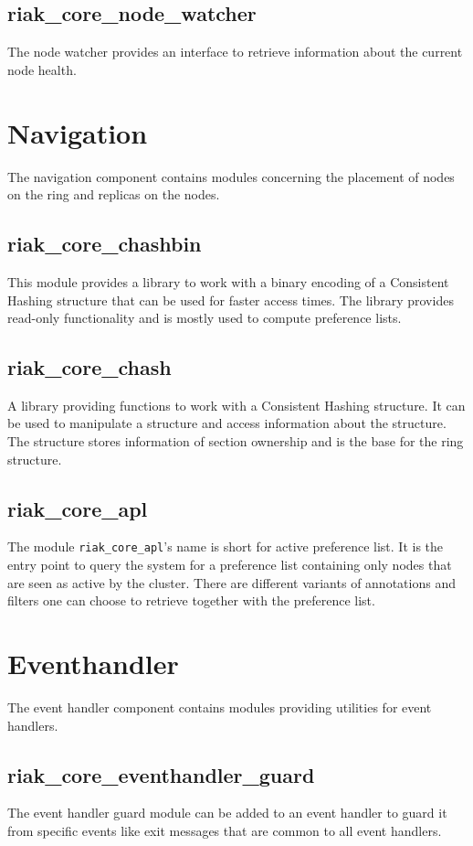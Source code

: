 	\subsection{riak\_core\_node\_watcher}
		The node watcher provides an interface to retrieve information about the current node health.
	

\section{Navigation}
	The navigation component contains modules concerning the placement of nodes on the ring and replicas on the nodes.
	\subsection{riak\_core\_chashbin}
		This module provides a library to work with a binary encoding of a Consistent Hashing structure that can be used for faster access times.
		The library provides read-only functionality and is mostly used to compute preference lists.
	
	\subsection{riak\_core\_chash}
		A library providing functions to work with a Consistent Hashing structure.
		It can be used to manipulate a structure and access information about the structure.
		The structure stores information of section ownership and is the base for the ring structure.
	
	\subsection{riak\_core\_apl}
		The module \lstinline!riak_core_apl!'s name is short for active preference list.
		It is the entry point to query the system for a preference list containing only nodes that are seen as active by the cluster.
		There are different variants of annotations and filters one can choose to retrieve together with the preference list. 
	

\section{Eventhandler}
	The event handler component contains modules providing utilities for event handlers.
	\subsection{riak\_core\_eventhandler\_guard}
			The event handler guard module can be added to an event handler to guard it from specific events like exit messages that are common to all event handlers.
	

